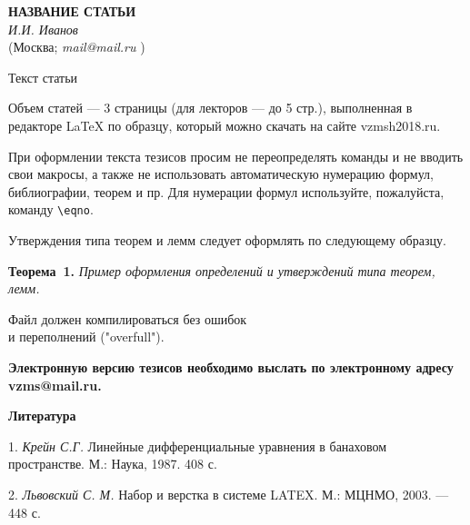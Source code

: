 \documentclass[a5paper,12pt,openbib]{report}
\begin{document}



\begin{center}{ \bf  НАЗВАНИЕ СТАТЬИ}\\
{\it И.И. Иванов } \\
(Москва; {\it mail@mail.ru} )
\end{center}


Текст статьи



Объем статей --- 3 страницы (для лекторов --- до 5 стр.),
выполненная в редакторе  LaTeX по  образцу, который можно скачать на
сайте vzmsh2018.ru.

При оформлении текста тезисов просим не  переопределять команды и не
вводить свои макросы, а также не использовать автоматическую
нумерацию формул, библиографии, теорем и пр. Для нумерации формул
используйте, пожалуйста, команду \verb"\eqno".

Утверждения типа теорем и лемм следует оформлять по следующему
образцу.

\textbf{Теорема~1.} {\it Пример оформления определений и утверждений
типа теорем, лемм.}

\begin{center}
Файл должен компилироваться без ошибок \\
и переполнений ("overfull").
\end{center}

\textbf{Электронную версию тезисов необходимо выслать  по
электронному адресу vzms@mail.ru.}

\smallskip \centerline{\bf Литература}\nopagebreak

1. {\it Крейн С.Г.} Линейные дифференциальные уравнения в банаховом пространстве. М.: Наука, 1987. 408 с.

2. {\it Львовский С. М.} Набор и верстка в системе LATEX. М.: МЦНМО, 2003. — 448 с.
\end{document}
